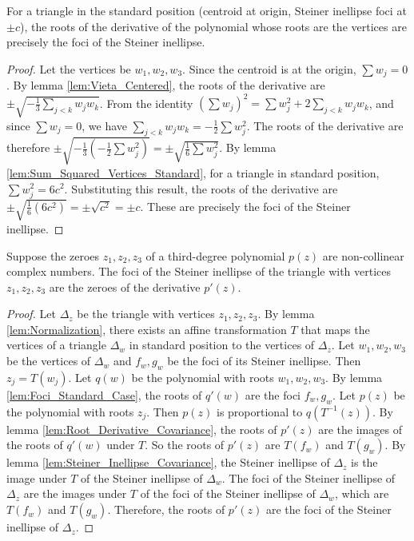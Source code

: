 \begin{lemma}
    \label{lem:Foci_Standard_Case}
    For a triangle in the standard position (centroid at origin, Steiner inellipse foci at $\pm c$), the roots of the derivative of the polynomial whose roots are the vertices are precisely the foci of the Steiner inellipse.
\end{lemma}
\begin{proof}
    Let the vertices be $w_1, w_2, w_3$. Since the centroid is at the origin, $\sum w_j=0$. By lemma \ref{lem:Vieta_Centered}, the roots of the derivative are $\pm\sqrt{-\frac{1}{3}\sum_{j<k} w_j w_k}$.
    From the identity $(\sum w_j)^2 = \sum w_j^2 + 2\sum_{j<k} w_j w_k$, and since $\sum w_j=0$, we have $\sum_{j<k} w_j w_k = -\frac{1}{2}\sum w_j^2$.
    The roots of the derivative are therefore $\pm\sqrt{-\frac{1}{3}(-\frac{1}{2}\sum w_j^2)} = \pm\sqrt{\frac{1}{6}\sum w_j^2}$.
    By lemma \ref{lem:Sum_Squared_Vertices_Standard}, for a triangle in standard position, $\sum w_j^2 = 6c^2$.
    Substituting this result, the roots of the derivative are $\pm\sqrt{\frac{1}{6}(6c^2)} = \pm\sqrt{c^2} = \pm c$. These are precisely the foci of the Steiner inellipse.
\end{proof}

\begin{theorem}
    \label{thm:Marden_Theorem}
    Suppose the zeroes $z_1, z_2, z_3$ of a third-degree polynomial $p(z)$ are non-collinear complex numbers. The foci of the Steiner inellipse of the triangle with vertices $z_1, z_2, z_3$ are the zeroes of the derivative $p'(z)$.
\end{theorem}
\begin{proof}
    Let $\Delta_z$ be the triangle with vertices $z_1, z_2, z_3$. By lemma \ref{lem:Normalization}, there exists an affine transformation $T$ that maps the vertices of a triangle $\Delta_w$ in standard position to the vertices of $\Delta_z$. Let $w_1, w_2, w_3$ be the vertices of $\Delta_w$ and $f_w, g_w$ be the foci of its Steiner inellipse. Then $z_j = T(w_j)$.
    Let $q(w)$ be the polynomial with roots $w_1, w_2, w_3$. By lemma \ref{lem:Foci_Standard_Case}, the roots of $q'(w)$ are the foci $f_w, g_w$.
    Let $p(z)$ be the polynomial with roots $z_j$. Then $p(z)$ is proportional to $q(T^{-1}(z))$.
    By lemma \ref{lem:Root_Derivative_Covariance}, the roots of $p'(z)$ are the images of the roots of $q'(w)$ under $T$. So the roots of $p'(z)$ are $T(f_w)$ and $T(g_w)$.
    By lemma \ref{lem:Steiner_Inellipse_Covariance}, the Steiner inellipse of $\Delta_z$ is the image under $T$ of the Steiner inellipse of $\Delta_w$. The foci of the Steiner inellipse of $\Delta_z$ are the images under $T$ of the foci of the Steiner inellipse of $\Delta_w$, which are $T(f_w)$ and $T(g_w)$.
    Therefore, the roots of $p'(z)$ are the foci of the Steiner inellipse of $\Delta_z$.
\end{proof}